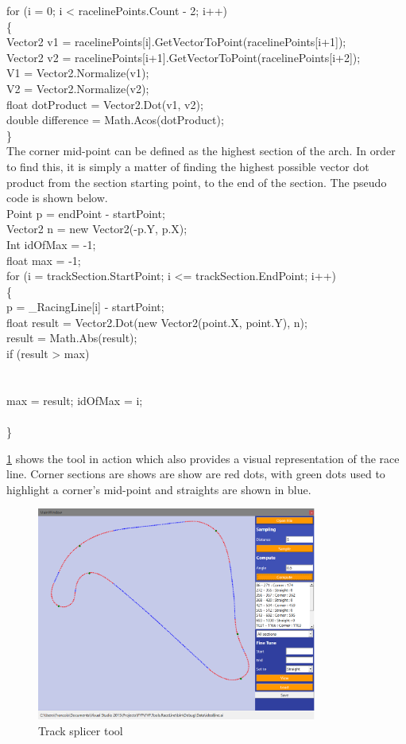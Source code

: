 for (i = 0; i < racelinePoints.Count - 2; i++)\\
\{\\
Vector2 v1 = racelinePoints[i].GetVectorToPoint(racelinePoints[i+1]);\\
Vector2 v2 = racelinePoints[i+1].GetVectorToPoint(racelinePoints[i+2]);\\
V1 = Vector2.Normalize(v1);\\
V2 = Vector2.Normalize(v2);\\
float dotProduct = Vector2.Dot(v1, v2);\\
double difference = Math.Acos(dotProduct);\\
\}\\

The corner mid-point can be defined as the highest section of the arch. In order to find this, it is simply a matter of finding the highest possible vector dot product from the section starting point, to the end of the section. The pseudo code is shown below.\\

Point p = endPoint - startPoint;\\
Vector2 n = new Vector2(-p.Y, p.X);\\
Int idOfMax = -1;\\
float max = -1;\\
for (i = trackSection.StartPoint; i <= trackSection.EndPoint; i++)\\
\{\\
p = \_RacingLine[i] - startPoint;\\
float result = Vector2.Dot(new Vector2(point.X, point.Y), n);\\
result = Math.Abs(result);\\
if (result > max)\\
\\{\\
	max = result;
	idOfMax = i;
	\\}\\
\}

\ref{fig:TrackSplicerTool} shows the tool in action which also provides a visual representation of the race line. Corner sections are shows are show are red dots, with green dots used to highlight a corner’s mid-point and straights are shown in blue.

\begin{figure}[!htb]
	\centering
	\includegraphics[height=7cm]{images/tracksplicertool}
	\caption{Track splicer tool}
	\label{fig:TrackSplicerTool}
\end{figure}

